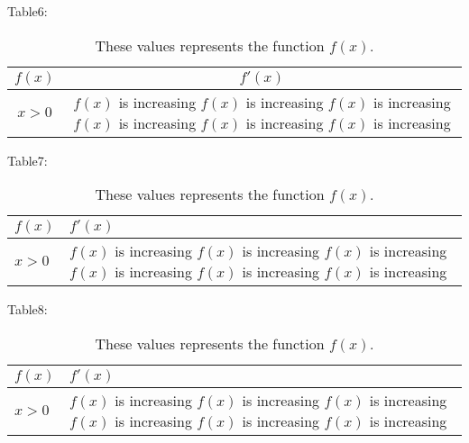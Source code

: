 \documentclass[11pt]{article}
\begin{document}
Table6: \\[5pt]
\begin{table}[H]
\centering
\caption{These values represents the function $f(x)$.}
\def\arraystretch{1.5}
\begin{tabular}{|c|c|}
\hline
$f(x)$ & $f'(x)$\\ \hline
$x>0$ & $f(x)$ is increasing $f(x)$ is increasing $f(x)$ is increasing $f(x)$ is increasing $f(x)$ is increasing $f(x)$ is increasing\\ \hline
\end{tabular}
\end{table}

Table7: \\[5pt]
\begin{table}[H]
\centering
\caption{These values represents the function $f(x)$.}
\def\arraystretch{1.5}
\begin{tabular}{|l|l|}
\hline
$f(x)$ & $f'(x)$\\ \hline
$x>0$ & $f(x)$ is increasing $f(x)$ is increasing $f(x)$ is increasing $f(x)$ is increasing $f(x)$ is increasing $f(x)$ is increasing\\ \hline
\end{tabular}
\end{table}

Table8: \\[5pt]
\begin{table}[H]
\centering
\caption{These values represents the function $f(x)$.}
\def\arraystretch{1.5}
\begin{tabular}{|l|p{3in}|}
\hline
$f(x)$ & $f'(x)$\\ \hline
$x>0$ & $f(x)$ is increasing $f(x)$ is increasing $f(x)$ is increasing $f(x)$ is increasing $f(x)$ is increasing $f(x)$ is increasing\\ \hline
\end{tabular}
\end{table}
\end{document}
